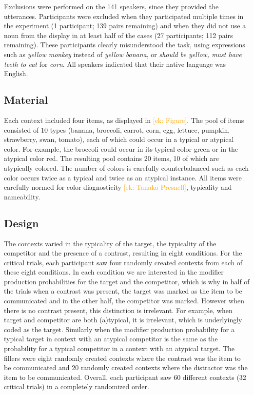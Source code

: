 \documentclass[10pt,letterpaper]{article}
\newcommand{\ek}[1]{\textcolor{Orange}{[ek: #1]}}
\begin{document}
Exclusions were performed on the 141 speakers, since they provided the utterances. Participants were excluded when they participated multiple times in the experiment (1 participant; 139 pairs remaining) and when they did not use a noun from the display in at least half of the cases (27 participants; 112 pairs remaining). These participants clearly misunderstood the task, using expressions such as \textit{yellow monkey} instead of \textit{yellow banana}, or \textit{should be yellow, must have teeth to eat} for \textit{corn}. All speakers indicated that their native language was English.


\subsection{Material} \label{Material}
Each context included four items, as displayed in \ek{Figure}. The pool of items consisted of 10 types (banana, broccoli, carrot, corn, egg, lettuce, pumpkin, strawberry, swan, tomato), each of which could occur in a typical or atypical color. For example, the broccoli could occur in its typical color green or in the atypical color red. The resulting pool contains 20 items, 10 of which are atypically colored. The number of colors is carefully counterbalanced such as each color occurs twice as a typical and twice as an atypical instance. All items were carefully normed for color-diagnosticity \ek{Tanaka Presnell}, typicality and nameability.


\subsection{Design}
The contexts varied in the typicality of the target, the typicality of the competitor and the presence of a contrast, resulting in eight conditions. For the critical trials, each participant saw four randomly created contexts from each of these eight conditions. In each condition we are interested in the modifier production probabilities for the target and the competitor, which is why in half of the trials when a contrast was present, the target was marked as the item to be communicated and in the other half, the competitor was marked. However when there is no contrast present, this distinction is irrelevant. For example, when target and competitor are both (a)typical, it is irrelevant, which is underlyingly coded as the target. Similarly when the modifier production probability for a typical target in context with an atypical competitor is the same as the probability for a typical competitor in a context with an atypical target. 
The fillers were eight randomly created contexts where the contrast was the item to be communicated and 20 randomly created contexts where the distractor was the item to be communicated.
Overall, each participant saw 60 different contexts (32 critical trials) in a completely randomized order.
\end{document}
